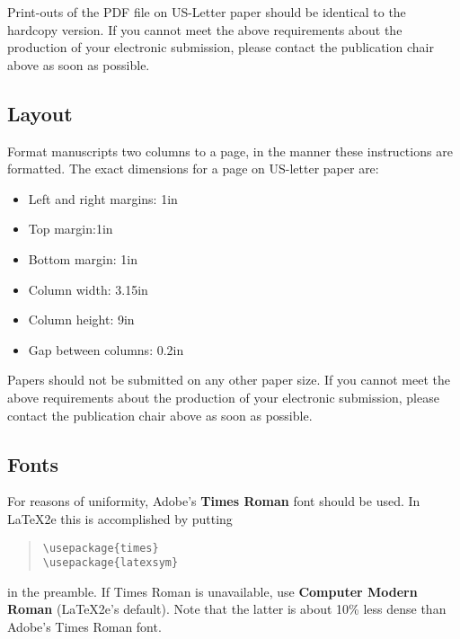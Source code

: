 \documentclass[11pt,letterpaper]{article}
\begin{document}
Print-outs of the PDF file on US-Letter paper should be identical to the
hardcopy version.  If you cannot meet the above requirements about the
production of your electronic submission, please contact the
publication chair above as soon as possible.


\subsection{Layout}
\label{ssec:layout}

Format manuscripts two columns to a page, in the manner these
instructions are formatted. The exact dimensions for a page on US-letter
paper are:

\begin{itemize}
\item Left and right margins: 1in
\item Top margin:1in
\item Bottom margin: 1in
\item Column width: 3.15in
\item Column height: 9in
\item Gap between columns: 0.2in
\end{itemize}

\noindent Papers should not be submitted on any other paper size. If you cannot meet the above requirements about the production of your electronic submission, please contact the publication chair above as soon as possible.

\subsection{Fonts}

For reasons of uniformity, Adobe's {\bf Times Roman} font should be
used. In \LaTeX2e{} this is accomplished by putting

\begin{quote}
\begin{verbatim}
\usepackage{times}
\usepackage{latexsym}
\end{verbatim}
\end{quote}
in the preamble. If Times Roman is unavailable, use {\bf Computer
  Modern Roman} (\LaTeX2e{}'s default).  Note that the latter is about
  10\% less dense than Adobe's Times Roman font.
\end{document}
